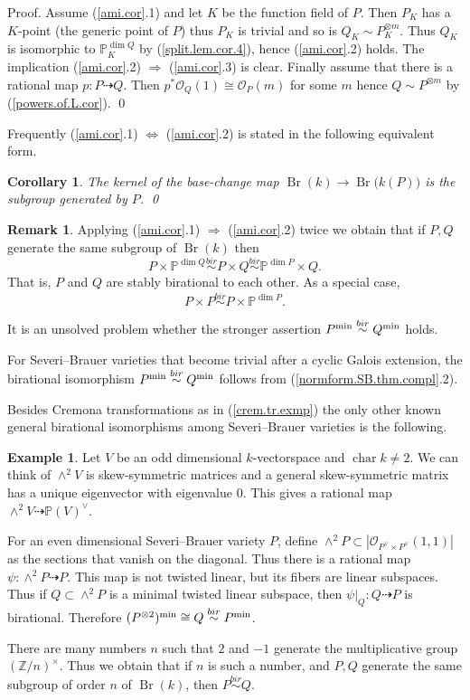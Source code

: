 \documentclass{amsart}
\newtheorem{cor}[thm]{Corollary}
\theoremstyle{definition}
\newtheorem{exmp}[thm]{Example}
\newtheorem{rem}[thm]{Remark}
\theoremstyle{remark}
\renewcommand{\o}[0]{{\mathcal O}}
\newcommand{\z}[0]{{\mathbb Z}}
\newcommand{\p}[0]{{\mathbb P}}
\newcommand{\map}[0]{\dasharrow}
\newcommand{\chr}[0]{\operatorname{char}}
\newcommand{\br}[0]{\operatorname{Br}}
\newcommand{\simb}[0]{\stackrel{bir}{\sim}}
\begin{document}
Proof. Assume (\ref{ami.cor}.1) and let $K$ be the function field of $P$. Then $P_K$ has a $K$-point
(the generic point of $P$) thus $P_K$ is trivial and so is
$Q_K\sim P_K^{\otimes m}$. 
Thus $Q_K$  is isomorphic to $\p^{\dim Q}_K$ by (\ref{split.lem.cor.4}), hence
(\ref{ami.cor}.2) holds.  The implication (\ref{ami.cor}.2) $\Rightarrow$ (\ref{ami.cor}.3) is clear.
Finally assume that there is a rational map  $p:P\map Q$. Then 
$p^*\o_Q(1)\cong \o_P(m)$ for some $m$ hence
$Q\sim  P^{\otimes m}$ by (\ref{powers.of.L.cor}). \qed



\medskip

Frequently (\ref{ami.cor}.1) $\Leftrightarrow$  (\ref{ami.cor}.2) is stated in the following equivalent form.

\begin{cor} The kernel of the base-change map
$\br(k)\to \br\bigl(k(P)\bigr)$ is the subgroup generated by $P$. \qed
\end{cor} 

\begin{rem} \label{ami.cor.cor} Applying  (\ref{ami.cor}.1) $\Rightarrow$ (\ref{ami.cor}.2)
twice we obtain that if 
 $P, Q$ generate the same subgroup of $\br(k)$ then
$$
P\times \p^{\dim Q}\simb P\times  Q\simb \p^{\dim P}\times Q.
$$
That is, $P$ and $Q$ are stably birational to each other.
As a special case,
$$P\times  P\simb  P\times \p^{\dim P}.$$

 It is an unsolved problem whether  the stronger assertion
$P^{\rm min}\simb Q^{\rm min}$
holds.

For Severi--Brauer varieties that  become trivial after a cyclic Galois extension, the birational isomorphism
$P^{\rm min}\simb Q^{\rm min}$ follows from (\ref{normform.SB.thm.compl}.2).

Besides Cremona transformations as in (\ref{crem.tr.exmp})
the only other known general birational isomorphisms among  Severi--Brauer varieties  is the following.
\end{rem}


\begin{exmp} \label{tregub.map} \cite{tregub}
Let $V$  be an odd dimensional $k$-vectorspace and $\chr k\neq 2$.
We can think of $\wedge^2V$ is skew-symmetric matrices and a general
skew-symmetric matrix has a unique eigenvector with eigenvalue 0.
This gives a rational map  $\wedge^2 V\map \p(V)^{\vee}$.

For an  even dimensional 
Severi--Brauer variety $P$, define
$\wedge^2 P\subset |\o_{P^\vee\times P^\vee}(1,1)|$ as the sections that vanish on the diagonal. Thus there is a rational map
$\psi: \wedge^2 P\map P$.
This map is not twisted linear, but its fibers are linear
subspaces. Thus if $Q\subset \wedge^2 P$ is a  minimal  twisted linear
subspace,  then $\psi|_Q:Q\map P$ is birational.
Therefore
$(P^{\otimes 2})^{\rm min}\cong Q \simb P^{\rm min}$.

There are many numbers $n$ such that $2$ and $-1$ generate the
multiplicative group  $(\z/n)^{\times}$. Thus we obtain that if
$n$ is such a number, and 
 $P, Q$ generate the same subgroup of order $n$ of $\br(k)$, then
$P\simb Q$. 
\end{exmp}
\end{document}

